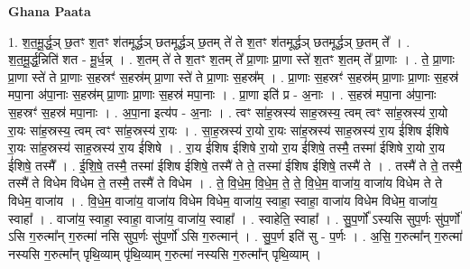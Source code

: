 \documentclass[17pt]{extarticle}
\begin{document}
\textbf{Ghana Paata } \newline

1. श॒त॒मू॒र्द्ध॒ञ् छ॒तꣳ श॒तꣳ श॑तमूर्द्धञ् छतमूर्द्धञ् छ॒तम् ते॑ ते श॒तꣳ श॑तमूर्द्धञ् छतमूर्द्धञ् छ॒तम् ते᳚ । . श॒त॒मू॒र्द्ध॒न्निति॑ शत - मू॒र्ध॒न्न् । . श॒तम् ते॑ ते श॒तꣳ श॒तम् ते᳚ प्रा॒णाः प्रा॒णा स्ते॑ श॒तꣳ श॒तम् ते᳚ प्रा॒णाः । . ते॒ प्रा॒णाः प्रा॒णा स्ते॑ ते प्रा॒णाः स॒हस्रꣳ॑ स॒हस्र॑म् प्रा॒णा स्ते॑ ते प्रा॒णाः स॒हस्र᳚म् । . प्रा॒णाः स॒हस्रꣳ॑ स॒हस्र॑म् प्रा॒णाः प्रा॒णाः स॒हस्र॑ मपा॒ना अ॑पा॒नाः स॒हस्र॑म् प्रा॒णाः प्रा॒णाः स॒हस्र॑ मपा॒नाः । . प्रा॒णा इति॑ प्र - अ॒नाः । . स॒हस्र॑ मपा॒ना अ॑पा॒नाः स॒हस्रꣳ॑ स॒हस्र॑ मपा॒नाः । . अ॒पा॒ना इत्य॑प - अ॒नाः । . त्वꣳ सा॑ह॒स्रस्य॑ साह॒स्रस्य॒ त्वम् त्वꣳ सा॑ह॒स्रस्य॑ रा॒यो रा॒यः सा॑ह॒स्रस्य॒ त्वम् त्वꣳ सा॑ह॒स्रस्य॑ रा॒यः । . सा॒ह॒स्रस्य॑ रा॒यो रा॒यः सा॑ह॒स्रस्य॑ साह॒स्रस्य॑ रा॒य ई॑शिष ईशिषे रा॒यः सा॑ह॒स्रस्य॑ साह॒स्रस्य॑ रा॒य ई॑शिषे । . रा॒य ई॑शिष ईशिषे रा॒यो रा॒य ई॑शिषे॒ तस्मै॒ तस्मा॑ ईशिषे रा॒यो रा॒य ई॑शिषे॒ तस्मै᳚ । . ई॒शि॒षे॒ तस्मै॒ तस्मा॑ ईशिष ईशिषे॒ तस्मै॑ ते ते॒ तस्मा॑ ईशिष ईशिषे॒ तस्मै॑ ते । . तस्मै॑ ते ते॒ तस्मै॒ तस्मै॑ ते विधेम विधेम ते॒ तस्मै॒ तस्मै॑ ते विधेम । . ते॒ वि॒धे॒म॒ वि॒धे॒म॒ ते॒ ते॒ वि॒धे॒म॒ वाजा॑य॒ वाजा॑य विधेम ते ते विधेम॒ वाजा॑य । . वि॒धे॒म॒ वाजा॑य॒ वाजा॑य विधेम विधेम॒ वाजा॑य॒ स्वाहा॒ स्वाहा॒ वाजा॑य विधेम विधेम॒ वाजा॑य॒ स्वाहा᳚ । . वाजा॑य॒ स्वाहा॒ स्वाहा॒ वाजा॑य॒ वाजा॑य॒ स्वाहा᳚ । . स्वाहेति॒ स्वाहा᳚ । . सु॒प॒र्णो᳚ ऽस्यसि सुप॒र्णः सु॑प॒र्णो॑ ऽसि ग॒रुत्मा᳚न् ग॒रुत्मा॑ नसि सुप॒र्णः सु॑प॒र्णो॑ ऽसि ग॒रुत्मान्॑ । . सु॒प॒र्ण इति॑ सु - प॒र्णः । . अ॒सि॒ ग॒रुत्मा᳚न् ग॒रुत्मा॑ नस्यसि ग॒रुत्मा᳚न् पृथि॒व्याम् पृ॑थि॒व्याम् ग॒रुत्मा॑ नस्यसि ग॒रुत्मा᳚न् पृथि॒व्याम् । \newline
\end{document}
